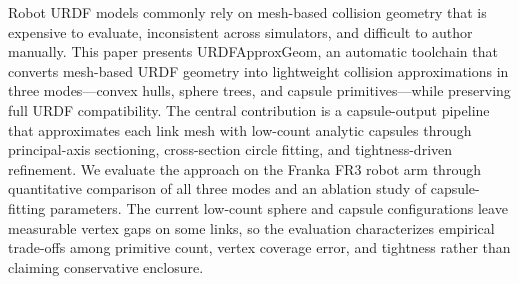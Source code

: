 Robot URDF models commonly rely on mesh-based collision geometry that is expensive to evaluate, inconsistent across simulators, and difficult to author manually. This paper presents URDFApproxGeom, an automatic toolchain that converts mesh-based URDF geometry into lightweight collision approximations in three modes---convex hulls, sphere trees, and capsule primitives---while preserving full URDF compatibility. The central contribution is a capsule-output pipeline that approximates each link mesh with low-count analytic capsules through principal-axis sectioning, cross-section circle fitting, and tightness-driven refinement. We evaluate the approach on the Franka FR3 robot arm through quantitative comparison of all three modes and an ablation study of capsule-fitting parameters. The current low-count sphere and capsule configurations leave measurable vertex gaps on some links, so the evaluation characterizes empirical trade-offs among primitive count, vertex coverage error, and tightness rather than claiming conservative enclosure.

